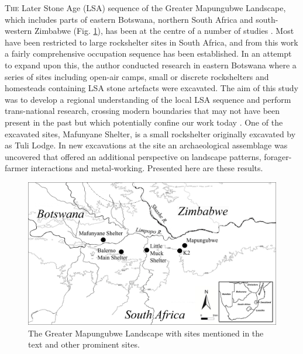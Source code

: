 	
	\lettrine[nindent=0em,lines=3]{T}{he} Later Stone Age (LSA) sequence of the Greater Mapungubwe Landscape, which includes parts of eastern Botswana, northern South Africa and south-western Zimbabwe (Fig. \ref{fig:Forssmann-Figure01}), has been at the centre of a number of studies \parencites[e.g.][]{Hall_2000}{van Doornum_2005}{van Doornum_2007}{van Doornum_2008}{van Doornum_2014}{Forssman_2010}{Forssman_2013a}{Forssman_2013b}{Forssman_2013c}{Forssman_2014a}{Forssman_2014b}. Most have been restricted to large rockshelter sites in South Africa, and from this work a fairly comprehensive occupation sequence has been established. In an attempt to expand upon this, the author conducted research in eastern Botswana where a series of sites including open-air camps, small or discrete rockshelters and homesteads containing LSA stone artefacts were excavated. The aim of this study was to develop a regional understanding of the local LSA sequence and perform trans-national research, crossing modern boundaries that may not have been present in the past but which potentially confine our work today \parencites[for details see][]{Forssman_2013c}{Forssman_2014a}{Forssman_2014b}{Forssman_2015}. One of the excavated sites, Mafunyane Shelter, is a small rockshelter originally excavated by \textcite{Walker_1994} as Tuli Lodge. In new excavations at the site an archaeological assemblage was uncovered that offered an additional perspective on landscape patterns, forager-farmer interactions and metal-working. Presented here are these results.
	
\begin{figure}
		\includegraphics[width=\linewidth]{../figures/Forssman-Figure01}
		\caption{The Greater Mapungubwe Landscape with sites mentioned in the text and other prominent sites.}
		\label{fig:Forssmann-Figure01}
\end{figure}
	
